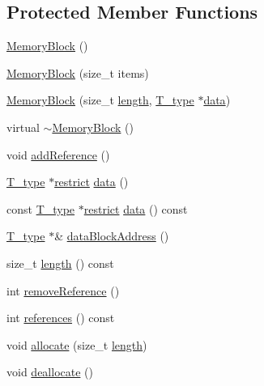 \subsection*{Protected Member Functions}
\begin{DoxyCompactItemize}
\item 
\hyperlink{classMemoryBlock_a9163b536fb7736ab1415633cbcd07ba5}{Memory\+Block} ()
\item 
\hyperlink{classMemoryBlock_acf8b341bee3d039b22596164cf8ce1a1}{Memory\+Block} (size\+\_\+t items)
\item 
\hyperlink{classMemoryBlock_a7cf3347d579045ea26b6e5bfbc5093c6}{Memory\+Block} (size\+\_\+t \hyperlink{classMemoryBlock_a8f84962332d0ad33d004e291ac3797c4}{length}, \hyperlink{classMemoryBlock_a6281668c80ac278a3912d82549b69d25}{T\+\_\+type} $\ast$\hyperlink{classMemoryBlock_a6cb6c999416b3dab1b120156fce2a1ee}{data})
\item 
virtual \hyperlink{classMemoryBlock_aa4bd0004d3f6452e205ac328bf87a0f3}{$\sim$\+Memory\+Block} ()
\item 
void \hyperlink{classMemoryBlock_a450beb9276de1e25ad85fcc6372a1b64}{add\+Reference} ()
\item 
\hyperlink{classMemoryBlock_a6281668c80ac278a3912d82549b69d25}{T\+\_\+type} $\ast$\hyperlink{compiler_8h_a080abdcb9c02438f1cd2bb707af25af8}{restrict} \hyperlink{classMemoryBlock_a6cb6c999416b3dab1b120156fce2a1ee}{data} ()
\item 
const \hyperlink{classMemoryBlock_a6281668c80ac278a3912d82549b69d25}{T\+\_\+type} $\ast$\hyperlink{compiler_8h_a080abdcb9c02438f1cd2bb707af25af8}{restrict} \hyperlink{classMemoryBlock_aa7736e3ccff0db3a43b70a8b9b05fd54}{data} () const 
\item 
\hyperlink{classMemoryBlock_a6281668c80ac278a3912d82549b69d25}{T\+\_\+type} $\ast$\& \hyperlink{classMemoryBlock_a7b44e01c3f8af72e6e695a766afeea72}{data\+Block\+Address} ()
\item 
size\+\_\+t \hyperlink{classMemoryBlock_a8f84962332d0ad33d004e291ac3797c4}{length} () const 
\item 
int \hyperlink{classMemoryBlock_af9277d6452801374fe337623f5413058}{remove\+Reference} ()
\item 
int \hyperlink{classMemoryBlock_a91009415fa949d3949ba829c760b6c9d}{references} () const 
\item 
void \hyperlink{classMemoryBlock_a79728c7175f48ddab3d31042843f9d96}{allocate} (size\+\_\+t \hyperlink{classMemoryBlock_a8f84962332d0ad33d004e291ac3797c4}{length})
\item 
void \hyperlink{classMemoryBlock_a01a4125a3dbff1c7cde94934ff0841c3}{deallocate} ()
\end{DoxyCompactItemize}
